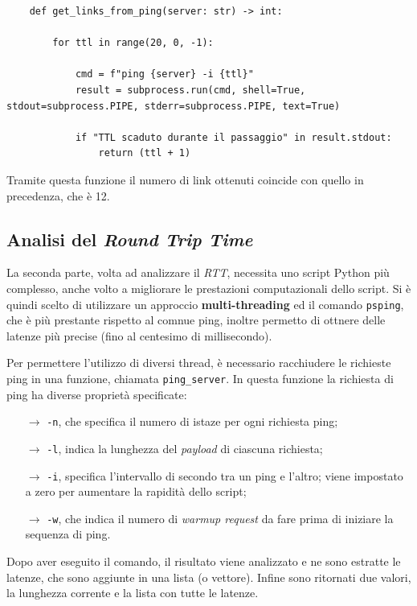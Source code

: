 \begin{lstlisting}
    def get_links_from_ping(server: str) -> int:

        for ttl in range(20, 0, -1):

            cmd = f"ping {server} -i {ttl}"
            result = subprocess.run(cmd, shell=True, stdout=subprocess.PIPE, stderr=subprocess.PIPE, text=True)

            if "TTL scaduto durante il passaggio" in result.stdout:
                return (ttl + 1)
\end{lstlisting}

\noindent Tramite questa funzione il numero di link ottenuti coincide con quello in precedenza, che è 12.


\vspace{15px}\subsection{Analisi del \textsl{Round Trip Time}}

La seconda parte, volta ad analizzare il \textsl{RTT}, necessita uno script Python più complesso, anche volto a migliorare le prestazioni computazionali dello script. Si è quindi scelto di utilizzare un approccio \textbf{multi-threading} ed il comando \texttt{psping}, che è più prestante rispetto al comnue ping, inoltre permetto di ottnere delle latenze più precise (fino al centesimo di millisecondo).

Per permettere l'utilizzo di diversi thread, è necessario racchiudere le richieste ping in una funzione, chiamata \texttt{ping\_server}. In questa funzione la richiesta di ping ha diverse proprietà specificate:
\vspace{-3px}
\begin{itemize}
    \setlength{\itemsep}{-2px}
    \item[$\to$] \texttt{-n}, che specifica il numero di istaze per ogni richiesta ping;
    \item[$\to$] \texttt{-l}, indica la lunghezza del \textsl{payload} di ciascuna richiesta;
    \item[$\to$] \texttt{-i}, specifica l'intervallo di secondo tra un ping e l'altro; viene impostato a zero per aumentare la rapidità dello script;
    \item[$\to$] \texttt{-w}, che indica il numero di \textsl{warmup request} da fare prima di iniziare la sequenza di ping.
\end{itemize}
\noindent Dopo aver eseguito il comando, il risultato viene analizzato e ne sono estratte le latenze, che sono aggiunte in una lista (o vettore). Infine sono ritornati due valori, la lunghezza corrente e la lista con tutte le latenze.

